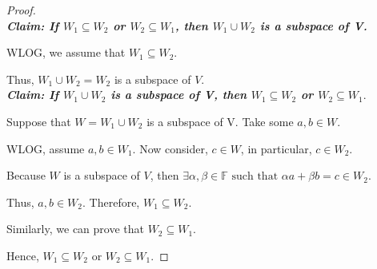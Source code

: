 \documentclass[12pt, reqno]{amsart}
\theoremstyle{definition}
\numberwithin{equation}{section}
\newcommand{\dF}{{\mathbb F}}
\begin{document}
\begin{proof} \hfill\\
\textbf{\textit{Claim: If $W_1 \subseteq W_2$ or $W_2 \subseteq W_1$, then $W_1 \cup W_2$ is a subspace of V.}}
   
    WLOG, we assume that $W_1 \subseteq W_2$.
    
    Thus, $W_1 \cup W_2 = W_2$ is a subspace of $V$.\\    
 \textbf{\textit{Claim: If $W_1 \cup W_2$ is a subspace of V, then $W_1 \subseteq W_2$ or $W_2 \subseteq W_1.$} }
    
    Suppose that $W= W_1 \cup W_2$ is a subspace of V. Take some $a, b \in W$.
    
    WLOG, assume $a,b \in W_1$. Now consider, $c \in W$, in particular, $c \in W_2$.
    
    Because $W$ is a subspace of $V$, then $ \exists \alpha, \beta \in \dF \text{ such that } \alpha a+ \beta b = c \in W_2$.
    
    Thus, $a, b \in W_2$. Therefore, $W_1 \subseteq W_2$.
    
    Similarly, we can prove that $W_2 \subseteq W_1$.
    
    Hence, $W_1 \subseteq W_2$ or $W_2 \subseteq W_1$.
\end{proof}
\end{document}
